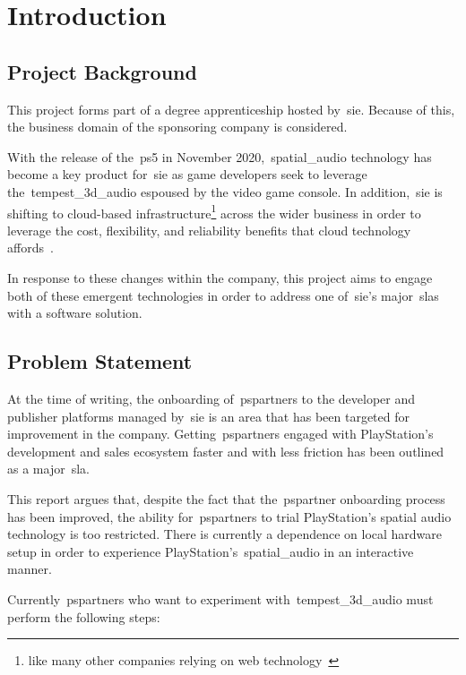 \thispagestyle{plain}
\newpage
\section{Introduction}\label{sec:introduction}
\subsection{Project Background}\label{subsec:project-background}
\normalsize

This project forms part of a degree apprenticeship hosted by~\gls{sie}.
Because of this, the business domain of the sponsoring company is considered.

With the release of the~\gls{ps5} in November 2020,~\gls{spatial_audio} technology has become a key product for~\gls{sie} as game developers seek to leverage the~\gls{tempest_3d_audio} espoused by the video game console.
In addition,~\gls{sie} is shifting to cloud-based infrastructure\footnote{like many other companies relying on web technology~\citep{cc_overview}} across the wider business in order to leverage the cost, flexibility, and reliability benefits that cloud technology affords~\citep{cc_overview}.

In response to these changes within the company, this project aims to engage both of these emergent technologies in order to address one of~\gls{sie}'s major~\glspl{sla} with a software solution.

\subsection{Problem Statement}\label{subsec:problem-statement}

At the time of writing,
the onboarding of~\glspl{pspartner} to the developer and publisher platforms
managed by~\gls{sie} is an area that has been targeted for improvement in the company.
Getting~\glspl{pspartner} engaged with PlayStation's development and sales ecosystem faster and with less friction has been outlined as a major~\gls{sla}.

This report argues that, despite the fact that the~\gls{pspartner} onboarding process has been improved, the ability for~\glspl{pspartner} to trial PlayStation's spatial audio technology is too restricted.
There is currently a dependence on local hardware setup in order to experience PlayStation's~\gls{spatial_audio} in an interactive manner.

Currently~\glspl{pspartner} who want to experiment with~\gls{tempest_3d_audio} must perform the following steps:

